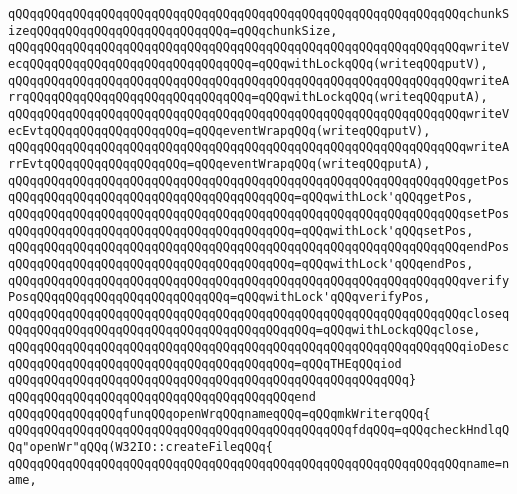 \verb|qQQqqQQqqQQqqQQqqQQqqQQqqQQqqQQqqQQqqQQqqQQqqQQqqQQqqQQqqQQqqQQqchunkSizeqQQqqQQqqQQqqQQqqQQqqQQqqQQq=qQQqchunkSize,|\newline
\verb|qQQqqQQqqQQqqQQqqQQqqQQqqQQqqQQqqQQqqQQqqQQqqQQqqQQqqQQqqQQqqQQqwriteVecqQQqqQQqqQQqqQQqqQQqqQQqqQQqqQQq=qQQqwithLockqQQq(writeqQQqputV),|\newline
\verb|qQQqqQQqqQQqqQQqqQQqqQQqqQQqqQQqqQQqqQQqqQQqqQQqqQQqqQQqqQQqqQQqwriteArrqQQqqQQqqQQqqQQqqQQqqQQqqQQqqQQq=qQQqwithLockqQQq(writeqQQqputA),|\newline
\verb|qQQqqQQqqQQqqQQqqQQqqQQqqQQqqQQqqQQqqQQqqQQqqQQqqQQqqQQqqQQqqQQqwriteVecEvtqQQqqQQqqQQqqQQqqQQq=qQQqeventWrapqQQq(writeqQQqputV),|\newline
\verb|qQQqqQQqqQQqqQQqqQQqqQQqqQQqqQQqqQQqqQQqqQQqqQQqqQQqqQQqqQQqqQQqwriteArrEvtqQQqqQQqqQQqqQQqqQQq=qQQqeventWrapqQQq(writeqQQqputA),|\newline
\verb|qQQqqQQqqQQqqQQqqQQqqQQqqQQqqQQqqQQqqQQqqQQqqQQqqQQqqQQqqQQqqQQqgetPosqQQqqQQqqQQqqQQqqQQqqQQqqQQqqQQqqQQqqQQq=qQQqwithLock'qQQqgetPos,|\newline
\verb|qQQqqQQqqQQqqQQqqQQqqQQqqQQqqQQqqQQqqQQqqQQqqQQqqQQqqQQqqQQqqQQqsetPosqQQqqQQqqQQqqQQqqQQqqQQqqQQqqQQqqQQqqQQq=qQQqwithLock'qQQqsetPos,|\newline
\verb|qQQqqQQqqQQqqQQqqQQqqQQqqQQqqQQqqQQqqQQqqQQqqQQqqQQqqQQqqQQqqQQqendPosqQQqqQQqqQQqqQQqqQQqqQQqqQQqqQQqqQQqqQQq=qQQqwithLock'qQQqendPos,|\newline
\verb|qQQqqQQqqQQqqQQqqQQqqQQqqQQqqQQqqQQqqQQqqQQqqQQqqQQqqQQqqQQqqQQqverifyPosqQQqqQQqqQQqqQQqqQQqqQQqqQQq=qQQqwithLock'qQQqverifyPos,|\newline
\verb|qQQqqQQqqQQqqQQqqQQqqQQqqQQqqQQqqQQqqQQqqQQqqQQqqQQqqQQqqQQqqQQqcloseqQQqqQQqqQQqqQQqqQQqqQQqqQQqqQQqqQQqqQQqqQQq=qQQqwithLockqQQqclose,|\newline
\verb|qQQqqQQqqQQqqQQqqQQqqQQqqQQqqQQqqQQqqQQqqQQqqQQqqQQqqQQqqQQqqQQqioDescqQQqqQQqqQQqqQQqqQQqqQQqqQQqqQQqqQQqqQQq=qQQqTHEqQQqiod|\newline
\verb|qQQqqQQqqQQqqQQqqQQqqQQqqQQqqQQqqQQqqQQqqQQqqQQqqQQqqQQq}|\newline
\verb|qQQqqQQqqQQqqQQqqQQqqQQqqQQqqQQqqQQqqQQqend|\newline
\newline
\verb|qQQqqQQqqQQqqQQqfunqQQqopenWrqQQqnameqQQq=qQQqmkWriterqQQq{|\newline
\verb|qQQqqQQqqQQqqQQqqQQqqQQqqQQqqQQqqQQqqQQqqQQqqQQqfdqQQq=qQQqcheckHndlqQQq"openWr"qQQq(W32IO::createFileqQQq{|\newline
\verb|qQQqqQQqqQQqqQQqqQQqqQQqqQQqqQQqqQQqqQQqqQQqqQQqqQQqqQQqqQQqqQQqname=name,|\newline

